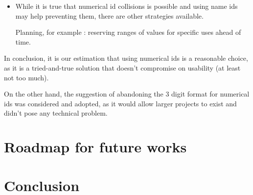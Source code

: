 \documentclass[11pt]{article}
\begin{document}
{\begin{itemize}
\begin{itemize}
		\item Not all characters are usable : every file system imposes limitations, which would impose unwanted restrictions for developers.
		
		\item Dealing with names/strings means that ids are typically longer and less formally defined (can contain more caracters, including casing, accents, etc), therefore amplifying the risk of any id containing errors.
		
		
		\item Developers involved in this type of project are typically capable of dealing with numerical ids without issue already.
		
		\item For large projects with hundreds/thousands of maps, name collisions may force developers to use convoluted or cumbersome naming schemes.
	\end{itemize}
	
	Note that some of the issues identified may be circumvented by re-introducing the "name" field in the files themselves, but at this point the percieved value of the change would become nil.
	
	\item While it is true that numerical id collisions is possible and using name ids may help preventing them, there are other strategies available. 
	
	Planning, for example : reserving ranges of values for specific uses ahead of time.
\end{itemize}

\vspace{4mm}
In conclusion, it is our estimation that using numerical ids is a reasonable choice, as it is a tried-and-true solution that doesn't compromise on usability (at least not too much).

On the other hand, the suggestion of abandoning the 3 digit format for numerical ids was considered and adopted, as it would allow larger projects to exist and didn't pose any technical problem.

\newpage 
\section{Roadmap for future works}



\newpage 
\section{Conclusion}


}
\end{document}
